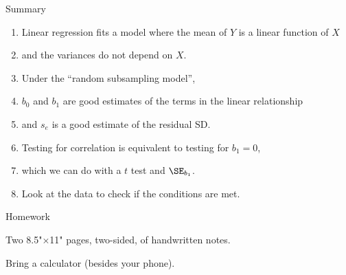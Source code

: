 \begin{frame}{Summary}
  \begin{enumerate}
      \item Linear regression fits a model where the mean of $Y$ is a linear function of $X$
      \item and the variances do not depend on $X$.
      \item Under the ``random subsampling model'',
      \item $b_0$ and $b_1$ are good estimates of the terms in the linear relationship
      \item and $s_e$ is a good estimate of the residual SD.
      \item Testing for correlation is equivalent to testing for $b_1=0$,
      \item which we can do with a $t$ test and $\SE_{b_1}$.
      \item Look at the data to check if the conditions are met.
  \end{enumerate}
\end{frame}

\begin{frame}{Homework}
  \begin{center}

      Two 8.5"$\times$11" pages, two-sided, of handwritten notes.

    \vspace{2em}

    Bring a calculator (besides your phone).

  \end{center}
\end{frame}








